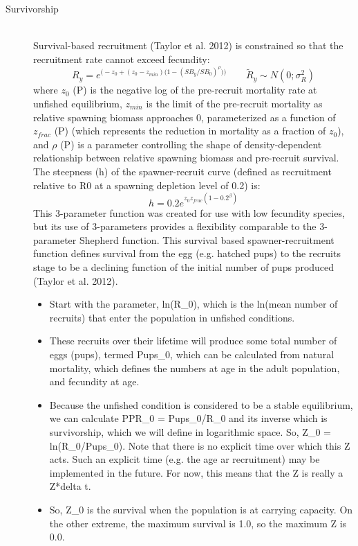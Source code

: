 \begin{description}
	\item[Survivorship]\hfill\\
	Survival-based recruitment (Taylor et al. 2012) is constrained so that the recruitment rate cannot exceed fecundity:
	\begin{equation}{ R_y = e^{\Big(-z_0 + (z_0-z_{min})\big(1-(SB_y/SB_0)^\rho \big)\Big)}\qquad  \tilde{R}_y\sim N(0;\sigma^2_R)}
	\end{equation}
	where $z_0$ (P) is the negative log of the pre-recruit mortality rate at unfished equilibrium, $z_{min}$ is the limit of the pre-recruit mortality as relative spawning biomass approaches 0, parameterized as a function of $z_{frac}$ (P) (which represents the reduction in mortality as a fraction of $z_0$), and $\rho$ (P) is a parameter controlling the shape of density-dependent relationship between relative spawning biomass and pre-recruit survival. The steepness (h) of the spawner-recruit curve (defined as recruitment relative to R0 at a spawning depletion level of 0.2) is:\\
	\begin{equation}
		h = 0.2e^{z_0z_{frac}(1-0.2^\beta)}
	\end{equation}
	This 3-parameter function was created for use with low fecundity species, but its use of 3-parameters provides a flexibility comparable to the 3-parameter Shepherd function.  This survival based spawner-recruitment function defines survival from the egg (e.g. hatched pups) to the recruits stage to be a declining function of the initial number of pups produced (Taylor et al. 2012).
	\begin{itemize}
		\item Start with the parameter, ln(R\_0), which is the ln(mean number of recruits) that enter the population in unfished conditions.
		\item These recruits over their lifetime will produce some total number of eggs (pups), termed Pups\_0, which can be calculated from natural mortality, which defines the numbers at age in the adult population, and fecundity at age.
		\item Because the unfished condition is considered to be a stable equilibrium, we can calculate PPR\_0 = Pups\_0/R\_0 and its inverse which is survivorship, which we will define in logarithmic space.  So, Z\_0 = ln(R\_0/Pups\_0).  Note that there is no explicit time over which this Z acts.  Such an explicit time (e.g. the age ar recruitment) may be implemented in the future.  For now, this means that the Z is really a Z*delta t.
		\item So, Z\_0 is the survival when the population is at carrying capacity.  On the other extreme, the maximum survival is 1.0, so the maximum Z is 0.0.

\end{itemize}
\end{description}
